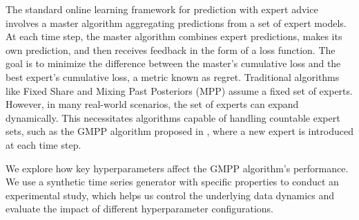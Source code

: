 \documentclass{icorsdssv2024}
\begin{document}
The standard online learning framework for prediction with expert advice involves a master algorithm aggregating predictions from a set of expert models. 
At each time step, the master algorithm combines expert predictions, makes its own prediction, and then receives feedback in the form of a loss function. 
The goal is to minimize the difference between the master's cumulative loss and the best expert's cumulative loss, a metric known as regret.
Traditional algorithms like Fixed Share \cite{article98} and Mixing Past Posteriors (MPP) \cite{article02} assume a fixed set of experts. 
However, in many real-world scenarios, the set of experts can expand dynamically. 
This necessitates algorithms capable of handling countable expert sets, such as the GMPP algorithm proposed in \cite{article}, where a new expert is introduced at each time step.

We explore how key hyperparameters affect the GMPP algorithm's performance. 
We use a synthetic time series generator with specific properties to conduct an experimental study, which helps us control the underlying data dynamics and evaluate the impact of different hyperparameter configurations.
\end{document}
